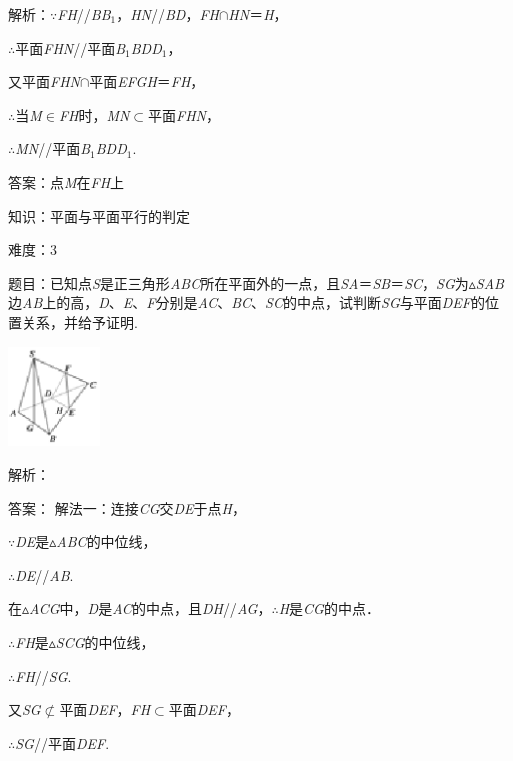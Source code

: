 \documentclass{article} %
\begin{document}
解析：$\mathrm{\because}$\textit{FH}//\textit{BB}${}_{1}$，\textit{HN}//\textit{BD}，\textit{FH}$\mathrm{\cap}$\textit{HN}＝\textit{H}，

$\mathrm{\therefore}$平面\textit{FHN}//平面\textit{B}${}_{1}$\textit{BDD}${}_{1}$，

又平面\textit{FHN}$\mathrm{\cap}$平面\textit{EFGH}＝\textit{FH}，

$\mathrm{\therefore}$当\textit{M}$\mathrm{\in}$\textit{FH}时，\textit{MN}$\mathrm{\subset }$平面\textit{FHN}，

$\mathrm{\therefore}$\textit{MN}//平面\textit{B}${}_{1}$\textit{BDD}${}_{1}$.

答案：点\textit{M}在\textit{FH}上

知识：平面与平面平行的判定

难度：3

题目：已知点\textit{S}是正三角形\textit{ABC}所在平面外的一点，且\textit{SA}＝\textit{SB}＝\textit{SC}，\textit{SG}为$\mathrm{\vartriangle}$\textit{SAB}边\textit{AB}上的高，\textit{D}、\textit{E}、\textit{F}分别是\textit{AC}、\textit{BC}、\textit{SC}的中点，试判断\textit{SG}与平面\textit{DEF}的位置关系，并给予证明.

\includegraphics*[width=0.96in, height=1.04in, keepaspectratio=false]{image155}

解析：

答案：
解法一：连接\textit{CG}交\textit{DE}于点\textit{H}，

$\mathrm{\because}$\textit{DE}是$\mathrm{\vartriangle}$\textit{ABC}的中位线，

$\mathrm{\therefore}$\textit{DE}//\textit{AB}.

在$\mathrm{\vartriangle}$\textit{ACG}中，\textit{D}是\textit{AC}的中点，且\textit{DH}//\textit{AG}，$\mathrm{\therefore}$\textit{H}是\textit{CG}的中点．

$\mathrm{\therefore}$\textit{FH}是$\mathrm{\vartriangle}$\textit{SCG}的中位线，

$\mathrm{\therefore}$\textit{FH}//\textit{SG}.

又\textit{SG}$\mathrm{\nsubset}$平面\textit{DEF}，\textit{FH}$\mathrm{\subset }$平面\textit{DEF}，

$\mathrm{\therefore}$\textit{SG}//平面\textit{DEF}.
\end{document}
